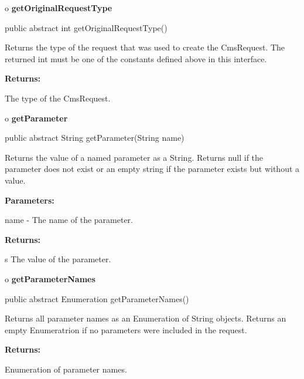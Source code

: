 o {\bf getOriginalRequestType} 

\begin{PRE}
 public abstract int getOriginalRequestType()
\end{PRE}

\begin{description}
\htmlDD Returns the type of the request that was used to create the
CmsRequest. The returned int must be one of the constants defined above in
this interface. 

\begin{description}
\item {\bf Returns:}  

The type of the CmsRequest.  
\end{description}

\end{description}

o {\bf getParameter} 

\begin{PRE}
 public abstract String getParameter(String name)
\end{PRE}

\begin{description}
\htmlDD Returns the value of a named parameter as a String. Returns null if
the parameter does not exist or an empty string if the parameter exists but
without a value. 

\begin{description}
\item {\bf Parameters:}  

name - The name of the parameter.  
\item {\bf Returns:}  

s The value of the parameter.  
\end{description}

\end{description}

o {\bf getParameterNames} 

\begin{PRE}
 public abstract Enumeration getParameterNames()
\end{PRE}

\begin{description}
\htmlDD Returns all parameter names as an Enumeration of String objects.
Returns an empty Enumeratrion if no parameters were included in the request. 

\begin{description}
\item {\bf Returns:}  

Enumeration of parameter names.  
\end{description}

\end{description}

